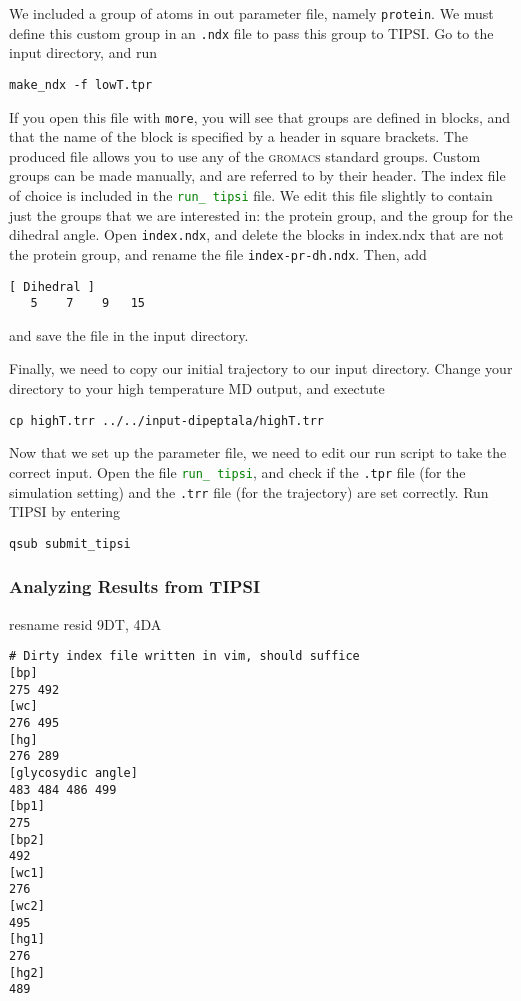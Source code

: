 \documentclass[]{article}
\begin{document}
We included a group of atoms in out parameter file, namely \texttt{protein}. We must define this custom group in an \texttt{.ndx} file to pass this group to TIPSI. Go to the input directory, and run
%
\begin{lstlisting}
make_ndx -f lowT.tpr
\end{lstlisting}
%
If you open this file with \texttt{more}, you will see that groups are defined in blocks, and that the name of the block is specified by a header in square brackets. The produced file allows you to use any of the \textsc{gromacs} standard groups. Custom groups can be made manually, and are referred to by their header. The index file of choice is included in the \textcolor{green}{\texttt{run\_ tipsi}} file. We edit this file slightly to contain just the groups that we are interested in: the protein group, and the group for the dihedral angle. Open \texttt{index.ndx}, and delete the blocks in index.ndx that are not the protein group, and rename the file \texttt{index-pr-dh.ndx}. Then, add
%
\begin{lstlisting}
[ Dihedral ]
   5    7    9   15
\end{lstlisting}
%
and save the file in the input directory.

Finally, we need to copy our initial trajectory to our input directory. Change your directory to your high temperature MD output, and exectute 
%
\begin{lstlisting}
cp highT.trr ../../input-dipeptala/highT.trr
\end{lstlisting}
%

Now that we set up the parameter file, we need to edit our run script to take the correct input. Open the file \textcolor{green}{\texttt{run\_ tipsi}}, and check if the \texttt{.tpr} file (for the simulation setting) and the \texttt{.trr} file (for the trajectory) are set correctly. Run \textsc{TIPSI} by entering
%
\begin{lstlisting}
qsub submit_tipsi
\end{lstlisting}
%

\subsubsection*{Analyzing Results from TIPSI}

resname resid 9DT, 4DA

\begin{lstlisting}
# Dirty index file written in vim, should suffice
[bp]
275 492
[wc]
276 495
[hg]
276 289
[glycosydic angle]
483 484 486 499
[bp1]
275
[bp2]
492
[wc1]
276
[wc2]
495
[hg1]
276
[hg2]
489
\end{lstlisting}
\end{document}
